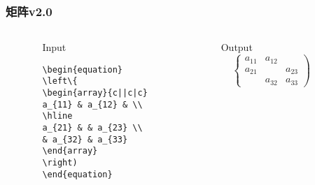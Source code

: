 \begin{frame}[fragile]\frametitle{矩阵v2.0}
  \begin{columns}
    \begin{column}{0.05\textwidth}
    \end{column}
    \begin{column}{0.45\textwidth}
    \begin{block}{Input}
    \begin{verbatim}
\begin{equation}
\left\{
\begin{array}{c||c|c}
a_{11} & a_{12} & \\
\hline
a_{21} & & a_{23} \\
& a_{32} & a_{33}
\end{array}
\right)
\end{equation}
    \end{verbatim}
    \end{block}
    \end{column}
    \begin{column}{0.025\textwidth}
    \end{column}
    \begin{column}{0.45\textwidth}
    \begin{block}{Output}
        \begin{equation}
        \left\{
        \begin{array}{c||c|c}
        a_{11} & a_{12} & \\
        \hline
        a_{21} & & a_{23} \\
        & a_{32} & a_{33}
        \end{array}
        \right)
        \end{equation}
    \end{block}
    \end{column}
    \begin{column}{0.025\textwidth}
    \end{column}
  \end{columns}
\end{frame}

